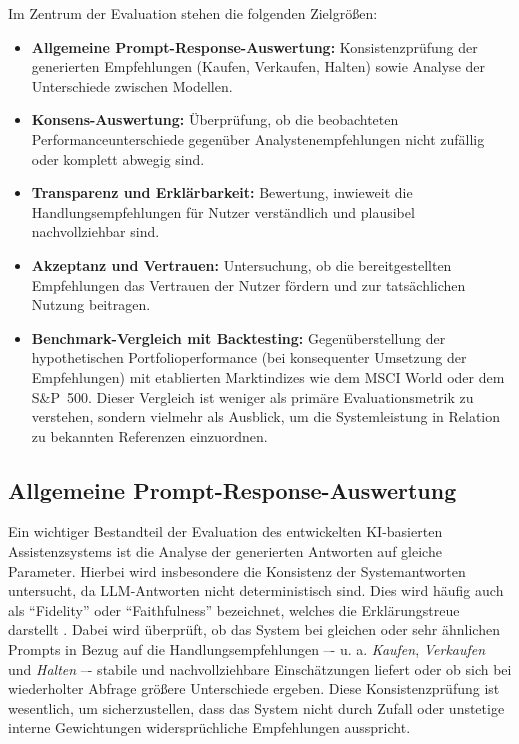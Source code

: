       Im Zentrum der Evaluation stehen die folgenden Zielgrößen:
      \begin{itemize}
        \item \textbf{Allgemeine Prompt-Response-Auswertung:} Konsistenzprüfung der generierten Empfehlungen (Kaufen, Verkaufen, Halten) sowie Analyse der Unterschiede zwischen Modellen.
        \item \textbf{Konsens-Auswertung:} Überprüfung, ob die beobachteten Performanceunterschiede gegenüber Analystenempfehlungen nicht zufällig oder komplett abwegig sind.
        \item \textbf{Transparenz und Erklärbarkeit:} Bewertung, inwieweit die Handlungsempfehlungen für Nutzer verständlich und plausibel nachvollziehbar sind.
        \item \textbf{Akzeptanz und Vertrauen:} Untersuchung, ob die bereitgestellten Empfehlungen das Vertrauen der Nutzer fördern und zur tatsächlichen Nutzung beitragen.
        \item \textbf{Benchmark-Vergleich mit Backtesting:} Gegenüberstellung der hypothetischen Portfolioperformance (bei konsequenter Umsetzung der Empfehlungen) mit etablierten Marktindizes wie dem MSCI World oder dem S\&P~500.
        Dieser Vergleich ist weniger als primäre Evaluationsmetrik zu verstehen, sondern vielmehr als Ausblick, um die Systemleistung in Relation zu bekannten Referenzen einzuordnen.
      \end{itemize}

    \subsection{Allgemeine Prompt-Response-Auswertung}

      Ein wichtiger Bestandteil der Evaluation des entwickelten \acs{KI}-basierten Assistenzsystems ist die Analyse der generierten Antworten auf gleiche Parameter.
      Hierbei wird insbesondere die Konsistenz der Systemantworten untersucht, da LLM-Antworten nicht deterministisch sind.
      Dies wird häufig auch als \enquote{Fidelity} oder \enquote{Faithfulness} bezeichnet, welches die Erklärungstreue darstellt \autocite[vgl.][S. 1]{Kadir2023}.
      Dabei wird überprüft, ob das System bei gleichen oder sehr ähnlichen Prompts in Bezug auf die Handlungsempfehlungen –- u. a. \textit{Kaufen}, \textit{Verkaufen} und \textit{Halten} –- stabile und nachvollziehbare Einschätzungen liefert oder ob sich bei wiederholter Abfrage größere Unterschiede ergeben.
      Diese Konsistenzprüfung ist wesentlich, um sicherzustellen, dass das System nicht durch Zufall oder unstetige interne Gewichtungen widersprüchliche Empfehlungen ausspricht.

